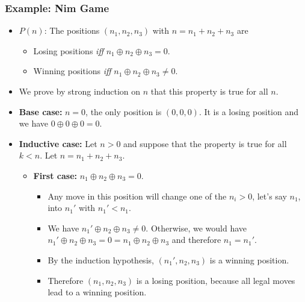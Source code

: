 \documentclass{beamer}
\begin{document}
\begin{frame}%
\frametitle{Example: Nim Game}

\scriptsize

\begin{itemize}

\item $P(n)$: The positions $(n_1, n_2, n_3)$ with $n = n_1 + n_2 + n_3$ are
\begin{itemize}
\scriptsize
\item<1-> Losing positions \emph{iff} $n_1 \oplus n_2 \oplus n_3 = 0$.
\item<1-> Winning positions \emph{iff} $n_1 \oplus n_2 \oplus n_3 \ne 0$.
\end{itemize}

\vspace{0.2cm}

\item<2-> We prove by strong induction on $n$ that this property is true for all $n$.

\vspace{0.2cm}

\item<3-> \textbf{Base case:} $n = 0$, the only position is $(0, 0, 0)$. It is a losing position and we have $0 \oplus 0 \oplus 0 = 0$.

\vspace{0.2cm}

\item<4-> \textbf{Inductive case:} Let $n > 0$ and suppose that the property is true for all $k < n$. Let $n = n_1 + n_2 + n_3$.
\begin{itemize}
\scriptsize
\item<4-> \textbf{First case:} $n_1 \oplus n_2 \oplus n_3 = 0$.
\begin{itemize}
\item<5-> Any move in this position will change one of the $n_i > 0$, let's say $n_1$, into $n_1'$ with $n_1' < n_1$.
\item<6-> We have $n_1' \oplus n_2 \oplus n_3 \ne 0$. Otherwise, we would have $n_1' \oplus n_2 \oplus n_3 = 0 = n_1 \oplus n_2 \oplus n_3$ and
therefore $n_1 = n_1'$.
\item<7-> By the induction hypothesis, $(n_1', n_2, n_3)$ is a winning position.
\item<8-> Therefore $(n_1, n_2, n_3)$ is a losing position, because all legal moves lead to a winning position.

\end{itemize}

\end{itemize}

\end{itemize}

\end{frame}
\end{document}
